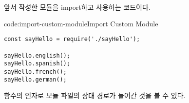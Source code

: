  앞서 작성한  모듈을 import하고 사용하는 코드이다.

\begin{codeenv}{code:import-custom-module}{Import Custom Module}\begin{verbatim}
const sayHello = require('./sayHello');

sayHello.english();
sayHello.spanish();
sayHello.french();
sayHello.german();
\end{verbatim}
\end{codeenv}

 함수의 인자로  모듈 파일의 상대 경로가 들어간 것을 볼 수 있다.
